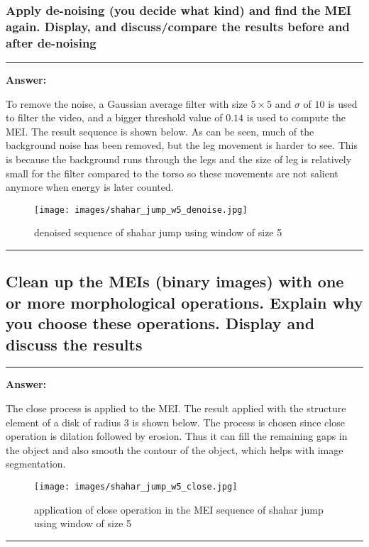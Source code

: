 \documentclass[conference]{styles/acmsiggraph}
\newenvironment{answer}{}{}
\begin{document}
	\subsubsection{Apply de-noising (you decide what kind) and find the MEI again. Display, and discuss/compare the results before and after de-noising}
\begin{answer}

		\rule{\textwidth}{0.4pt}
		\textbf{Answer:}

		To remove the noise, a Gaussian average filter with size $5\times5$ and $\sigma$ of $10$ is used to filter the video, and a bigger threshold value of $0.14$ is used to compute the MEI. The result sequence is shown below. As can be seen, much of the background noise has been removed, but the leg movement is harder to see. This is because the background runs through the legs and the size of leg is relatively small for the filter compared to the torso so these movements are not salient anymore when energy is later counted.
		\begin{figure}[H]
			\centering
			\texttt{[image: images/shahar\_jump\_w5\_denoise.jpg]}
			\caption{denoised sequence of shahar jump using window of size 5}
		\end{figure}

		\rule{\textwidth}{0.4pt}

\end{answer}
	
\subsection{Clean up the MEIs (binary images) with one or more morphological operations. Explain why you
choose these operations. Display and discuss the results}
\begin{answer}

	\rule{\textwidth}{0.4pt}
	\textbf{Answer:}
	
	The close process is applied to the MEI. The result applied with the structure element of a disk of radius $3$ is shown below. The process is chosen since close operation is dilation followed by erosion. Thus it can fill the remaining gaps in the object and also smooth the contour of the object, which helps with image segmentation.

	\begin{figure}[H]
		\centering
		\texttt{[image: images/shahar\_jump\_w5\_close.jpg]}
		\caption{application of close operation in the MEI sequence of shahar jump using window of size 5 }
	\end{figure}

	\rule{\textwidth}{0.4pt}

\end{answer}
\end{document}

